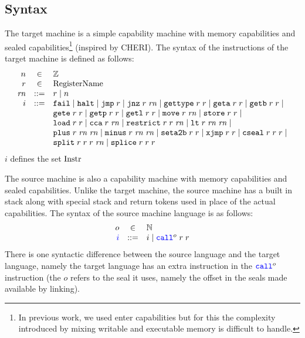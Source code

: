 \documentclass[a4paper]{article}
\begin{document}
\subsection{Syntax}
\label{sec:syntax}
The target machine is a simple capability machine with memory capabilities and sealed capabilities\footnote{In previous work, we used enter capabilities but for this the complexity introduced by mixing writable and executable memory is difficult to handle.} (inspired by CHERI). The syntax of the instructions of the target machine is defined as follows:
\[
\begin{array}{rcl}
n &\in & \ints \\
\trg{r} &\in &  \tRegName \\
\trg{\rn} &\defbnf &  \trg{r} \mid n \\
\trg{i} &\defbnf & \tfail \mid \thalt \mid \tjmp{\trg{r}} \mid \tjnz{\trg{r}}{\trg{\rn}} \mid \tisptr{\trg{r}}{\trg{r}} \mid \tgeta{\trg{r}}{\trg{r}} \mid \tgetb{\trg{r}}{\trg{r}} \mid \\
      & &  \tgete{\trg{r}}{\trg{r}}\mid \tgetp{\trg{r}}{\trg{r}} \mid \tgetlin{\trg{r}}{\trg{r}} \mid \tmove{\trg{r}}{\trg{\rn}} \mid \tstore{\trg{r}}{\trg{r}} \mid\\
      & &  \tload{\trg{r}}{\trg{r}} \mid \tcca{\trg{r}}{\trg{\rn}} \mid \trestrict{\trg{r}}{\trg{r}}{\trg{\rn}} \mid \tlt{\trg{r}}{\trg{\rn}}{\trg{\rn}} \mid \\
  & & \tplus{\trg{r}}{\trg{\rn}}{\trg{\rn}} \mid \tminus{\trg{r}}{\trg{\rn}}{\trg{\rn}} \mid \tsetatob{\trg{r}}{\trg{r}} \mid \txjmp{\trg{r}}{\trg{r}} \mid \tcseal{\trg{r}}{\trg{r}}{\trg{r}} \mid \\ 
      & &   \tsplit{\trg{r}}{\trg{r}}{\trg{r}}{\trg{\rn}} \mid\tsplice{\trg{r}}{\trg{r}}{\trg{r}} 
\end{array}
\]
$i$ defines the set $\mathrm{Instr}$


The source machine is also a capability machine with memory capabilities and sealed capabilities. Unlike the target machine, the source machine has a built in stack along with special stack and return tokens used in place of the actual capabilities. The syntax of the source machine language is as follows:
\[
  \begin{array}{rcl}
    o & \in & \nats \\
    \src{i} & \defbnf &  \trg{i} \mid \scall{o}{r}{r}
  \end{array}
\]
There is one syntactic difference between the source language and the target language, namely the target language has an extra instruction in the $\scall{o}{}{}$ instruction (the $o$ refers to the seal it uses, namely the offset in the seals made available by linking). 
\end{document}
